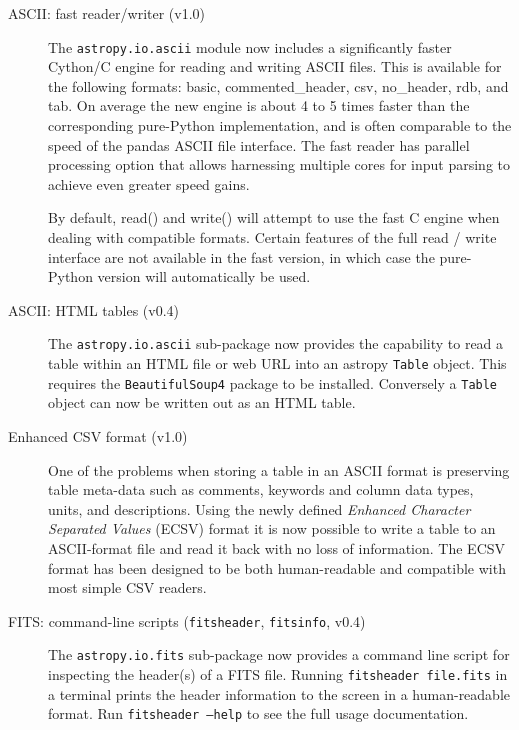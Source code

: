 \documentclass[modern]{aastex61}
\newcommand{\package}[1]{\texttt{#1}\xspace}
\begin{document}
\begin{description}

    \item[ASCII: fast reader/writer (v1.0)]

		The \package{astropy.io.ascii} module now includes a significantly faster
		Cython/C engine for reading and writing ASCII files. This is available
		for the following formats: basic, commented\_header, csv, no\_header,
		rdb, and tab.  On average the new engine is about 4 to 5 times faster
		than the corresponding pure-Python implementation, and is often
		comparable to the speed of the pandas ASCII file interface. The fast
		reader has parallel processing option that allows harnessing multiple
		cores for input parsing to achieve even greater speed gains.

		By default, read() and write() will attempt to use the fast C engine when
		dealing with compatible formats. Certain features of the full read / write
		interface are not available in the fast version, in which case the
		pure-Python version will automatically be used.

    \item[ASCII: HTML tables (v0.4)]

		The \package{astropy.io.ascii} sub-package now provides the capability
		to read a table within an HTML file or web URL into an astropy
		\texttt{Table} object. This requires the \package{BeautifulSoup4}
		package to be installed.  Conversely a \texttt{Table} object can now
		be written out as an HTML table.

	\item [Enhanced CSV format (v1.0)]

		One of the problems when storing a table in an ASCII format is
		preserving table meta-data such as comments, keywords and column data
		types, units, and descriptions. Using the newly defined \emph{Enhanced
		Character Separated Values} (ECSV) format it is now possible to write
		a table to an ASCII-format file and read it back with no loss of
		information. The ECSV format has been designed to be both
		human-readable and compatible with most simple CSV readers.

	\item [FITS: command-line scripts (\texttt{fitsheader}, \texttt{fitsinfo}, v0.4)]

		The \package{astropy.io.fits} sub-package now provides a command line
		script for inspecting the header(s) of a FITS file.  Running
		\texttt{fitsheader file.fits} in a terminal prints the header
		information to the screen in a human-readable format. Run
		\texttt{fitsheader --help} to see the full usage documentation.


\end{description}
\end{document}
